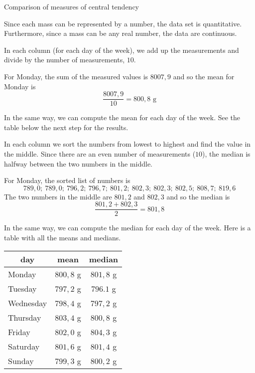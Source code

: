 \begin{wex}{Comparison of measures of central tendency}
{  

  Since each mass can be represented by a number, the data
  set is quantitative. Furthermore, since a mass can be any real
  number, the data are continuous.


  In each column (for each day of the week), we add up the
  measurements and divide by the number of measurements, $10$.

  For Monday, the sum of the measured values is $8007,9$ and so the
  mean for Monday is
  \begin{equation}
    \frac{8007,9}{10} = 800,8\textrm{ g}
  \end{equation}

  In the same way, we can compute the mean for each day of the
  week. See the table below the next step for the results.


  In each column we sort the numbers from lowest to highest and find
  the value in the middle. Since there are an even number of
  measurements ($10$), the median is halfway between the two numbers in
  the middle.

  For Monday, the sorted list of numbers is
  \begin{equation}
    789,0;\ 789,0;\ 796,2;\ 796,7;\ 801,2;\ 802,3;\ 802,3;\ 802,5;\ 808,7;\ 819,6
  \end{equation}
  The two numbers in the middle are $801,2$ and $802,3$ and so the
  median is
  \begin{equation}
    \frac{801,2 + 802,3}{2} = 801,8
  \end{equation}

  In the same way, we can compute the median for each day of the
  week. Here is a table with all the means and medians.

  \begin{center}
    \begin{tabular}{lcc}
      \toprule
      \multicolumn{1}{c}{day} & mean & median \\
      \midrule
      Monday & $800,8$ g & $801,8$ g \\
      Tuesday & $797,2$ g & $796.1$ g \\
      Wednesday & $798,4$ g & $797,2$ g \\
      Thursday & $803,4$ g & $800,8$ g \\
      Friday & $802,0$ g & $804,3$ g \\
      Saturday & $801,6$ g & $801,4$ g \\
      Sunday & $799,3$ g & $800,2$ g \\
      \bottomrule
    \end{tabular}
  \end{center}

}
\end{wex}
